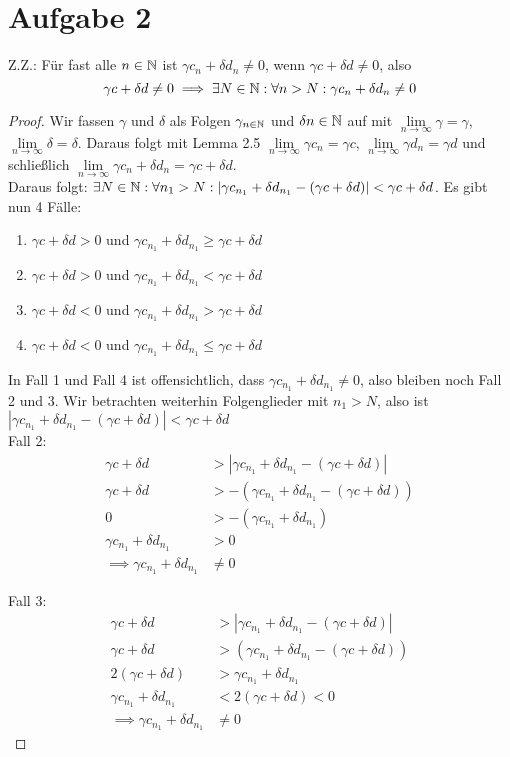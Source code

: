 \documentclass{article}
\newcommand{\mylimes}{\lim\limits_{n\to\infty}}
\begin{document}
	\section*{Aufgabe 2}
	Z.Z.: Für fast alle $n\in \mathbb{N}$ ist $\gamma c_n + \delta d_n \neq 0$, wenn $\gamma c + \delta d \neq 0$, also \[\gamma c + \delta d \neq 0 \implies \exists N\in \mathbb{N}: \forall n> N: \gamma c_n + \delta d_n \neq 0\]
	\begin{proof}
		Wir fassen $\gamma$ und $\delta$ als Folgen $\gamma_{n\in \mathbb{N}}$ und $\delta{n\in \mathbb{N}}$ auf mit $\mylimes \gamma = \gamma$, $\mylimes \delta = \delta$. Daraus folgt mit Lemma 2.5 $\mylimes \gamma c_n = \gamma c$, $\mylimes \gamma d_n = \gamma d$ und schließlich $\mylimes \gamma c_n + \delta d_n = \gamma c + \delta d$.\\
		Daraus folgt: $\exists N\in \mathbb{N}: \forall {n_1} > N: \left|\gamma c_{n_1} + \delta d_{n_1} - (\gamma c + \delta d)\right| < \gamma c + \delta d$.
		Es gibt nun 4 Fälle:
		\begin{enumerate}
			\item $\gamma c + \delta d > 0$ und $\gamma c_{n_1} + \delta d_{n_1} \geq \gamma c + \delta d$
			\item $\gamma c + \delta d > 0$ und $\gamma c_{n_1} + \delta d_{n_1} < \gamma c + \delta d$
			\item $\gamma c + \delta d < 0$ und $\gamma c_{n_1} + \delta d_{n_1} > \gamma c + \delta d$
			\item $\gamma c + \delta d < 0$ und $\gamma c_{n_1} + \delta d_{n_1} \leq \gamma c + \delta d$ 
		\end{enumerate}
	In Fall 1 und Fall 4 ist offensichtlich, dass $\gamma c_{n_1} + \delta d_{n_1} \neq 0$, also bleiben noch Fall 2 und 3.
	Wir betrachten weiterhin Folgenglieder mit $n_1> N$, also ist $\left|\gamma c_{n_1} + \delta d_{n_1} - (\gamma c + \delta d)\right| < \gamma c + \delta d$\\
	Fall 2:\begin{align*}
		\gamma c + \delta d &> \left|\gamma c_{n_1} + \delta d_{n_1} - (\gamma c + \delta d)\right|\\
		\gamma c + \delta d &> -\left(\gamma c_{n_1} + \delta d_{n_1} - (\gamma c + \delta d)\right)\\
		0 &> -(\gamma c_{n_1} + \delta d_{n_1})\\
		\gamma c_{n_1} + \delta d_{n_1} &> 0\\
		\implies \gamma c_{n_1} + \delta d_{n_1} &\neq 0
	\end{align*}
	
	Fall 3:\begin{align*}
	\gamma c + \delta d &> \left|\gamma c_{n_1} + \delta d_{n_1} - (\gamma c + \delta d)\right|\\
	\gamma c + \delta d &> \left(\gamma c_{n_1} + \delta d_{n_1} - (\gamma c + \delta d)\right)\\
	2 (\gamma c + \delta d ) &> \gamma c_{n_1} + \delta d_{n_1}\\
	\gamma c_{n_1} + \delta d_{n_1} &< 2 (\gamma c + \delta d ) < 0\\
	\implies \gamma c_{n_1} + \delta d_{n_1} &\neq 0
	\end{align*} 
\end{proof}
\end{document}
